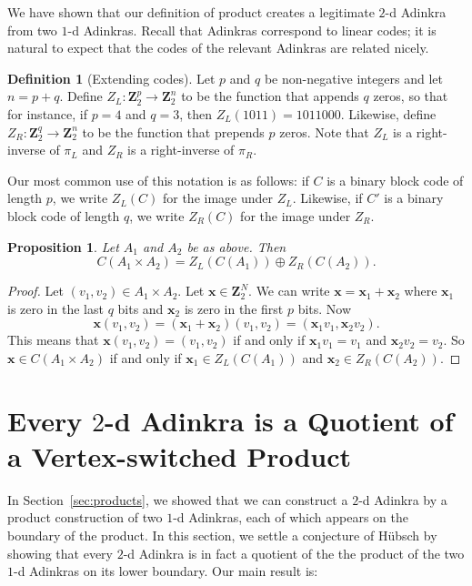\documentclass[12pt,twoside,singlespace]{article}
\numberwithin{equation}{section}
\newtheorem{prop}[equation]{Proposition}
\theoremstyle{definition}
\newtheorem{definition}[equation]{Definition}
\newcommand{\ZZ}{\mathbf{Z}}
\renewcommand{\vec}[1]{\mathbf{#1}}
\begin{document}
We have shown that our definition of product creates a legitimate $2$-d Adinkra from two $1$-d Adinkras. Recall that Adinkras correspond to linear codes; it is natural to expect that the codes of the relevant Adinkras are related nicely.

\begin{definition}[Extending codes]
Let $p$ and $q$ be non-negative integers and let $n=p+q$.  Define $Z_L:\ZZ_2^p\to\ZZ_2^n$ to be the function that appends $q$ zeros, so that for instance, if $p=4$ and $q=3$, then $Z_L(1011)=1011000$.  Likewise, define $Z_R:\ZZ_2^q\to\ZZ_2^n$ to be the function that prepends $p$ zeros.  Note that $Z_L$ is a right-inverse of $\pi_L$ and $Z_R$ is a right-inverse of $\pi_R$.

Our most common use of this notation is as follows: if $C$ is a binary block code of length $p$, we write $Z_L(C)$ for the image under $Z_L$.  Likewise, if $C'$ is a binary block code of length $q$, we write $Z_R(C)$ for the image under $Z_R$.
\end{definition}

\begin{prop}
Let $A_1$ and $A_2$ be as above.  Then
\[C(A_1\times A_2)=Z_L(C(A_1))\oplus Z_R(C(A_2)).\]
\end{prop}
\begin{proof}
Let $(v_1,v_2)\in A_1\times A_2$.  Let $\vec{x}\in \ZZ_2^N$.  We can write $\vec{x}=\vec{x}_1+\vec{x}_2$ where $\vec{x}_1$ is zero in the last $q$ bits and $\vec{x}_2$ is zero in the first $p$ bits.  Now
\[\vec{x}(v_1,v_2)=(\vec{x}_1+\vec{x}_2)(v_1,v_2)=(\vec{x}_1v_1,\vec{x}_2v_2).\]
This means that $\vec{x}(v_1,v_2)=(v_1,v_2)$ if and only if $\vec{x}_1v_1=v_1$ and $\vec{x}_2 v_2=v_2$. So $\vec{x}\in C(A_1\times A_2)$ if and only if $\vec{x}_1\in Z_L(C(A_1))$ and $\vec{x}_2\in Z_R(C(A_2))$.
\end{proof}





\section{Every $2$-d Adinkra is a Quotient of a Vertex-switched Product}
\label{sec:quotient}

In Section~\ref{sec:products}, we showed that we can construct a $2$-d Adinkra by a product construction of two $1$-d Adinkras, each of which appears on the boundary of the product. In this section, we settle a conjecture of H\"ubsch \cite{hubsch:weaving} by showing that every $2$-d Adinkra is in fact a quotient of the the product of the two $1$-d Adinkras on its lower boundary. Our main result is:
\end{document}
